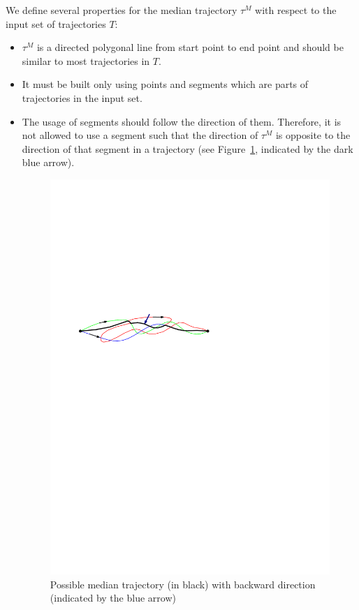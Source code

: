 We define several properties for the median trajectory  $\tau^{M}$ with respect to the input set of trajectories $T$:

\begin{itemize}
\item 
$\tau^{M}$ is a directed polygonal line from start point to end point and should be similar to most trajectories in $T$.

\item 
It must be built only using points and segments which are parts of trajectories in the input set. 

\item 
The usage of segments should follow the direction of them. Therefore, it is not allowed to use a segment such that the direction of $\tau^{M}$ is opposite to the direction of that segment in a trajectory (see Figure~\ref{fig:forbid_seg}, indicated by the dark blue arrow).

\begin{figure}
\centering
\includegraphics[scale=0.9]{Gambar/forbid_seg}
\caption[Possible median trajectory (in black) with backward direction (pointed by the blue arrow)]{Possible median trajectory (in black) with backward direction (indicated by the blue arrow)} 
\label{fig:forbid_seg}
\end{figure}


\end{itemize}
